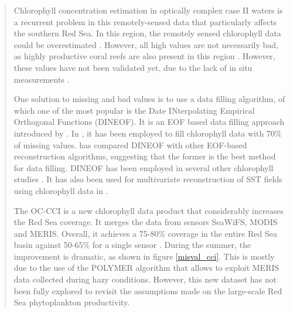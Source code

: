 \begin{quotation}
Chlorophyll concentration estimation in optically complex case II waters is a
recurrent problem in this remotely-sensed data that particularly affects the
southern Red Sea.  In this region, the remotely sensed chlorophyll data could
be overestimated \citep{Raitsos2013}. However, all high values are not
necessarily bad, as highly productive coral reefs are also present in this
region \citep{Raitsos2013}.  However, these values have not been validated yet,
due to the lack of in situ measurements \citep{Raitsos2013}.


One solution to missing and bad values is to use a data filling algorithm, of
which one of the most popular is the Date INterpolating Empirical Orthogonal
Functions (DINEOF). It is an EOF based data filling approach introduced by
\citet{Beckers2003}. In \citet{Sirjacobs2011}, it has been employed to fill
chlorophyll data with 70\% of missing values.  \citet{Taylor2013} has compared
DINEOF with other EOF-based reconstruction algorithms, suggesting that the
former is the best method for data filling.  DINEOF has been employed in
several other chlorophyll studies \citep{Miles2010, Waite2013}. It has also
been used for multivariate reconstruction of SST fields using chlorophyll data
in \citet{Alvera2007}. 

The OC-CCI is a new chlorophyll data product that considerably increases the
Red Sea coverage. It merges the data from sensors SeaWiFS, MODIS and MERIS.
Overall, it achieves a 75-80\% coverage in the entire Red Sea basin against
50-65\% for a single sensor \citep{Racault}. During the summer, the improvement
is dramatic, as shown in figure \ref{misval_cci}. This is mostly due to the use
of the POLYMER algorithm \citep{Steinmetz2011} that allows to exploit MERIS
data collected during hazy conditions. However, this new dataset has not been
fully explored to revisit the assumptions made on the large-scale Red Sea
phytoplankton productivity.



\end{quotation}
